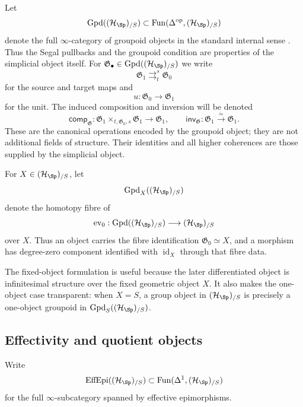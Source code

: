 Let
\[
    \operatorname{Gpd}((\mathcal H_{\Sp})_{/S})
    \subset
    \operatorname{Fun}(\Delta^{\mathrm{op}},(\mathcal H_{\Sp})_{/S})
\]
denote the full $\infty$-category of groupoid objects in the standard internal
sense \cite[Section~6.1.2]{LurieHTT}.  Thus the Segal pullbacks and the
groupoid condition are properties of the simplicial object itself.  For
$\mathfrak G_\bullet\in\operatorname{Gpd}((\mathcal H_{\Sp})_{/S})$ we write
\[
    \mathfrak G_1
    \mathop{\rightrightarrows}^{s}_{t}
    \mathfrak G_0
\]
for the source and target maps and
\[
    u:\mathfrak G_0\longrightarrow\mathfrak G_1
\]
for the unit.  The induced composition and inversion will be denoted
\[
    \mathsf{comp}_{\mathfrak G}:
    \mathfrak G_1\times_{t,\mathfrak G_0,s}\mathfrak G_1
    \longrightarrow
    \mathfrak G_1,
    \qquad
    \mathsf{inv}_{\mathfrak G}:\mathfrak G_1\xrightarrow{\simeq}\mathfrak G_1.
\]
These are the canonical operations encoded by the groupoid object; they are
not additional fields of structure.  Their identities and all higher
coherences are those supplied by the simplicial object.

\begin{definition}
\label{def:fixed-object-groupoids}
For $X\in(\mathcal H_{\Sp})_{/S}$, let
\[
    \operatorname{Gpd}_X((\mathcal H_{\Sp})_{/S})
\]
denote the homotopy fibre of
\[
    \operatorname{ev}_0:
    \operatorname{Gpd}((\mathcal H_{\Sp})_{/S})
    \longrightarrow
    (\mathcal H_{\Sp})_{/S}
\]
over $X$.  Thus an object carries the fibre identification
$\mathfrak G_0\simeq X$, and a morphism has degree-zero component identified
with $\operatorname{id}_X$ through that fibre data.
\end{definition}

\begin{remark}
The fixed-object formulation is useful because the later differentiated
object is infinitesimal structure over the fixed geometric object $X$.  It
also makes the one-object case transparent: when $X=S$, a group object in
$(\mathcal H_{\Sp})_{/S}$ is precisely a one-object
groupoid in $\operatorname{Gpd}_S((\mathcal H_{\Sp})_{/S})$.
\end{remark}

\subsection{Effectivity and quotient objects}

Write
\[
    \operatorname{EffEpi}((\mathcal H_{\Sp})_{/S})
    \subset
    \operatorname{Fun}(\Delta^1,(\mathcal H_{\Sp})_{/S})
\]
for the full $\infty$-subcategory spanned by effective epimorphisms.

